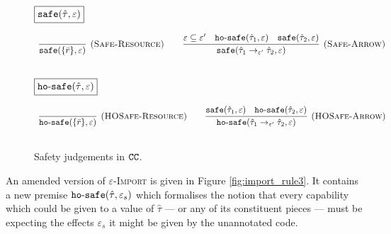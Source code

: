 \begin{figure}[h]

\noindent
$\fbox{$\mathtt{safe}(\hat \tau, \varepsilon)$}$

\[
\begin{array}{c}

\infer[\textsc{(Safe-Resource)}]
	{ \kwa{safe}(\{ \bar r \}, \varepsilon) }
	{} 
\hspace{5ex}
	
\infer[\textsc{(Safe-Arrow)}]
	{\kwa{safe}(\hat \tau_1 \rightarrow_{\varepsilon'} \hat \tau_2, \varepsilon)}
	{\varepsilon \subseteq \varepsilon' & \kwa{ho \hyphen safe}(\hat \tau_1, \varepsilon) & \kwa{safe}(\hat \tau_2, \varepsilon)} \\[3ex]

\end{array}
\]

\noindent
$\fbox{$\mathtt{ho \hbox{-} safe}(\hat \tau, \varepsilon)$}$

\[
\begin{array}{c}

\infer[\textsc{(HOSafe-Resource)}]
	{ \kwa{ho \hyphen safe}( \{ \bar r \}, \varepsilon)} 
	{}
\hspace{5ex}

\infer[\textsc{(HOSafe-Arrow)}]
	{ \kwa{ho \hyphen safe}( \hat \tau_1 \rightarrow_{\varepsilon'} \hat \tau_2, \varepsilon ) }
	{ \kwa{safe}(\hat \tau_1, \varepsilon)  & \kwa{ho \hyphen safe}(\hat \tau_2, \varepsilon) }\\[3ex]

\end{array}
\]

\vspace{-7pt}
\caption{Safety judgements in $\mathtt{CC}$.}
\label{fig:safe_defns}
\end{figure}

An amended version of \textsc{$\varepsilon$-Import} is given in Figure
\ref{fig:import_rule3}. It contains a new premise
$\mathtt{ho \hbox{-} safe}(\hat \tau, \varepsilon_s)$ which formalises the notion that
every capability which could be given to a value of $\hat \tau$ --- or
any of its constituent pieces --- must be expecting the effects
$\varepsilon_s$ it might be given by the unannotated code.

